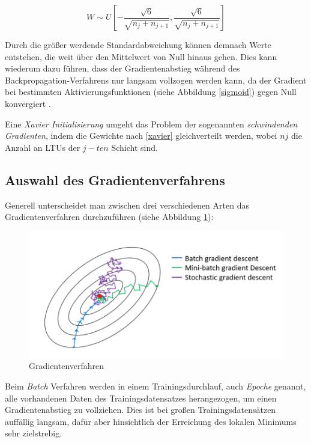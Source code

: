 \begin{equation} \label{xavier}
W \sim U[-\frac{\sqrt{6}}{\sqrt{n_{j} + n_{j+1}}},\frac{\sqrt{6}}{\sqrt{n_{j} + n_{j+1}}}]
\end{equation}

Durch die größer werdende Standardabweichung können demnach Werte entstehen, die weit über den Mittelwert von Null hinaus gehen. Dies kann wiederum dazu führen, dass der Gradientenabstieg während des Backpropagation-Verfahrens nur langsam vollzogen werden kann, da der Gradient bei bestimmten Aktivierungsfunktionen (siehe Abbildung \ref{sigmoid}) gegen Null konvergiert \cite[S. 275 f.]{AurelienGeron.2018}. 

Eine \textit{Xavier Initialisierung} umgeht das Problem der sogenannten \textit{schwindenden Gradienten}, indem die Gewichte nach \ref{xavier} gleichverteilt werden, wobei $n{j}$ die Anzahl an LTUs der $j-ten$ Schicht sind. \cite[S. 253]{XavierGlorot.2010}

\subsection*{Auswahl des Gradientenverfahrens}

Generell unterscheidet man zwischen drei verschiedenen Arten das Gradientenverfahren durchzuführen (siehe Abbildung \ref{gradient}):

\begin{figure}[ht]
	\begin{center}
		\includegraphics[width=15cm]{Bilder/gradient_descent.png} 
		\caption[Gradientenverfahren]{Gradientenverfahren \cite{ImadDabbura.20171221}}
		\label{gradient}
	\end{center}
\end{figure}

Beim \textit{Batch} Verfahren werden in einem Trainingsdurchlauf, auch \textit{Epoche} genannt, alle vorhandenen Daten des Trainingsdatensatzes herangezogen, um einen Gradientenabstieg zu vollziehen. Dies ist bei großen Trainingsdatensätzen auffällig langsam, dafür aber hinsichtlich der Erreichung des lokalen Minimums sehr zielstrebig. \cite[S. 116]{AurelienGeron.2018}

